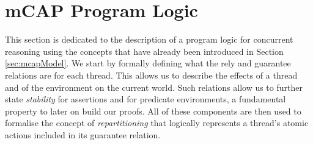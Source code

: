 \section{mCAP Program Logic}

This section is dedicated to the description of a program logic for concurrent reasoning using the concepts that have already been introduced in Section \ref{sec:mcapModel}. We start by formally defining what the rely and guarantee relations are for each thread. This allows us to describe the effects of a thread and of the environment on the current world. Such relations allow us to further state \textit{stability} for assertions and for predicate environments, a fundamental property to later on build our proofs. All of these components are then used to formalise the concept of \textit{repartitioning} \cite{cap}\cite{colosl} that logically represents a thread's atomic actions included in its guarantee relation.



\newpage



\newpage



\newpage



\newpage

